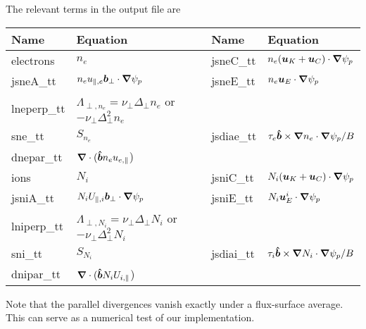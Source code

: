 The relevant terms in the output file are
\begin{longtable}{llll}
\toprule
\rowcolor{gray!50}\textbf{Name} &  \textbf{Equation} & \textbf{Name} &  \textbf{Equation}\\
\midrule
    electrons & $n_e$ &
    jsneC\_tt &$ n_e ( {\boldsymbol{u}}_K + {\boldsymbol{u}}_C )\cdot{\boldsymbol{\nabla}} \psi_p$ \\
    jsneA\_tt &$ n_e u_{\parallel,e} {\boldsymbol{ b}}_\perp  \cdot{\boldsymbol{\nabla}} \psi_p$ &
    jsneE\_tt & $ n_e {\boldsymbol{u}}_E\cdot{\boldsymbol{\nabla}}\psi_p$ \\
    lneperp\_tt &$ \Lambda_{\perp,n_e} = \nu_\perp \Delta_\perp n_e$ or $-\nu_\perp \Delta^2_\perp n_e$ &
    & \\
    sne\_tt & $S_{n_e}$ &
    jsdiae\_tt & $\tau_e \bm{\hat{b}} \times {\boldsymbol{\nabla}} n_e \cdot{\boldsymbol{\nabla}} \psi_p /B$\\
    dnepar\_tt & ${\boldsymbol{\nabla}}\cdot (\bm{\hat{b}} n_e u_{e,\parallel}$) &
    & \\
    ions & $N_i$ &
    jsniC\_tt &$ N_i ( {\boldsymbol{u}}_K + {\boldsymbol{u}}_C )\cdot{\boldsymbol{\nabla}} \psi_p$ \\
    jsniA\_tt &$ N_i U_{\parallel,i} {\boldsymbol{ b}}_\perp  \cdot{\boldsymbol{\nabla}} \psi_p$ &
    jsniE\_tt & $ N_i {\boldsymbol{u}}^i_E\cdot{\boldsymbol{\nabla}}\psi_p$ \\
    lniperp\_tt &$ \Lambda_{\perp,N_i} = \nu_\perp \Delta_\perp N_i$ or $-\nu_\perp \Delta^2_\perp N_i$ &
    & \\
    sni\_tt & $S_{N_i}$ &
    jsdiai\_tt & $\tau_i \bm{\hat{b}} \times {\boldsymbol{\nabla}} N_i \cdot{\boldsymbol{\nabla}} \psi_p /B$\\
    dnipar\_tt & ${\boldsymbol{\nabla}}\cdot (\bm{\hat{b}} N_i U_{i,\parallel}$) &
      & \\
\bottomrule
\end{longtable}



Note that the parallel divergences vanish exactly under a flux-surface average. This can serve as a numerical test of our implementation.
